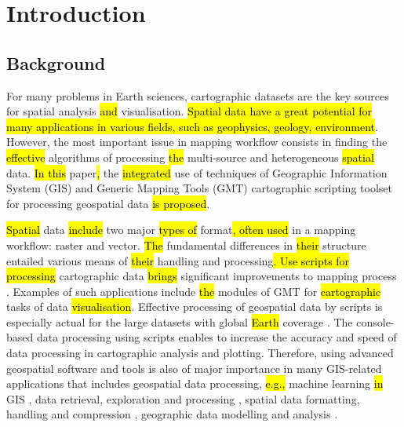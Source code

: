 \documentclass[data,article,submit,pdftex,moreauthors]{Definitions/mdpi}
\begin{document}

\section{Introduction}

\subsection{Background}

For many problems in Earth sciences, cartographic datasets are the key sources for spatial analysis \hl{and} visualisation. \hl{Spatial data have a great potential for many applications in various fields, such as geophysics, geology, environment}. However, the most important issue\hl{ }in mapping workflow consists in finding the \hl{effective} algorithms of\hl{ }processing \hl{the} multi-source and heterogeneous \hl{spatial} data. \hl{In this} paper\hl{,}  the \hl{integrated }use of techniques of Geographic Information System (GIS) and Generic Mapping Tools (GMT) cartographic scripting toolset for processing geospatial\hl{ }data \hl{is proposed}.

\hl{Spatial} data \hl{include} two major\hl{ types of} format\hl{, often used} in a mapping workflow: raster and vector. \hl{The }fundamental differences in \hl{their} structure entailed various means of \hl{their }handling and processing\hl{. Use scripts for processing} cartographic data \hl{brings} significant\hl{ }improvements to mapping process \cite{CHEN2022105362,ORTOLANO201856, Lemenkova202203,OMRAN2016140,data5010008}. Examples of such applications include \hl{the} modules of GMT for \hl{cartographic} tasks of data \hl{visualisation}. Effective processing of geospatial data by scripts is especially actual for the large datasets with global \hl{Earth} coverage \cite{LEI2020202,XIA2018245,NATIVI20151,WAGEMANN2021104916}. The console-based data processing using scripts enables to increase the accuracy and speed of data processing in cartographic analysis and plotting. Therefore, using advanced geospatial software and tools is also of major importance in many GIS-related applications that includes geospatial data processing, \hl{e.g.,} machine learning \hl{in} GIS \cite{Mori,1607434,ARABAMERI2021100848,ZUO2021105111,SUN201926}, data retrieval, exploration and processing \cite{BUCK2022121,Lemenkova202135,1369823}, spatial data formatting, handling and compression \cite{ZHU2022104166,data4030118,data6080081,DEMIRALTINTAS2021103743}, geographic data modelling and analysis \cite{MA2021103858,Lemenkova202205,TAMIMINIA2020152}. 
\end{document}
